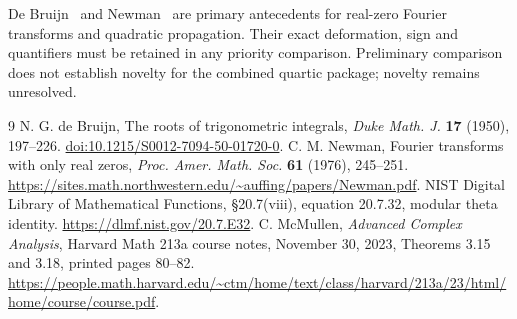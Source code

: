 \documentclass[11pt]{article}
\theoremstyle{remark}\newtheorem{remark}[theorem]{Remark}
\begin{document}
De Bruijn~\cite{debruijn} and Newman~\cite{newman} are primary
antecedents for real-zero Fourier transforms and quadratic
propagation. Their exact deformation, sign and quantifiers
must be retained in any priority comparison. Preliminary
comparison does not establish novelty for the combined
quartic package; novelty remains unresolved.

\begin{thebibliography}{9}
 N. G. de Bruijn,
The roots of trigonometric integrals,
\emph{Duke Math. J.} \textbf{17} (1950), 197--226.
\href{https://doi.org/10.1215/S0012-7094-50-01720-0}
{doi:10.1215/S0012-7094-50-01720-0}.
 C. M. Newman,
Fourier transforms with only real zeros,
\emph{Proc. Amer. Math. Soc.} \textbf{61} (1976), 245--251.
\url{https://sites.math.northwestern.edu/~auffing/papers/Newman.pdf}.
 NIST Digital Library of Mathematical Functions,
\S20.7(viii), equation 20.7.32, modular theta identity.
\url{https://dlmf.nist.gov/20.7.E32}.
 C. McMullen,
\emph{Advanced Complex Analysis}, Harvard Math 213a course notes,
November 30, 2023, Theorems 3.15 and 3.18, printed pages 80--82.
\url{https://people.math.harvard.edu/~ctm/home/text/class/harvard/213a/23/html/home/course/course.pdf}.
\end{thebibliography}
\end{document}
